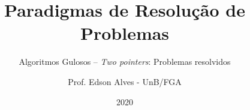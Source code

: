 \title{Paradigmas de Resolução de Problemas}
\subtitle{Algoritmos Gulosos -- {\it Two pointers}: Problemas resolvidos}
\author{Prof. Edson Alves - UnB/FGA}
\date{2020}
